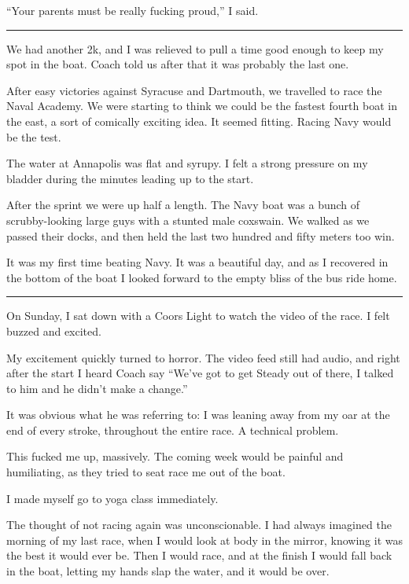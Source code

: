 ``Your parents must be really fucking proud,'' I said.

\plainfancybreak{12pt}{2}{}


We had another 2k, and I was relieved to pull a time good enough to keep my spot
in the boat.  Coach told us after that it was probably the last one.

After easy victories against Syracuse and Dartmouth, we travelled to race the
Naval Academy.  We were starting to think we could be the fastest fourth boat in
the east, a sort of comically exciting idea.  It seemed fitting.  Racing
Navy would be the test.

The water at Annapolis was flat and syrupy.  I felt a strong pressure on my
bladder during the minutes leading up to the start.   

After the sprint we were up half a length.  The Navy boat was a bunch of
scrubby-looking large guys with a stunted male coxswain.  We walked as we passed
their docks, and then held the last two hundred and fifty meters too win.  

It was my first time beating Navy.  It was a beautiful day, and as I recovered
in the bottom of the boat I looked forward to the empty bliss of the bus ride
home.

\plainfancybreak{12pt}{2}{}

On Sunday, I sat down with a Coors Light to watch the video of the race.  I felt
buzzed and excited. 

My excitement quickly turned to horror.  The video feed still had audio, and
right after the start I heard Coach say ``We've got to get Steady out of there,
I talked to him and he didn't make a change.''  

It was obvious what he was referring to: I was leaning away from my oar at the
end of every stroke, throughout the entire race.  A technical problem.

This fucked me up, massively.  The coming week would be painful and humiliating,
as they tried to seat race me out of the boat.

I made myself go to yoga class immediately.  

The thought of not racing again was unconscionable.  I had always imagined the
morning of my last race, when I would look at body in the mirror, knowing it was
the best it would ever be.  Then I would race, and at the finish I would fall
back in the boat, letting my hands slap the water, and it would be over.

